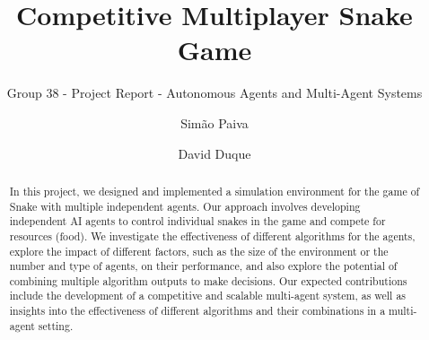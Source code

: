 \documentclass[sigconf]{aamas}  %
\begin{document}
\title{Competitive Multiplayer Snake Game}  %


\subtitle{Group 38 - Project Report - Autonomous Agents and Multi-Agent Systems}

%
\author{Simão Paiva}

\author{David Duque}
%
%
%
%
%
%


\begin{abstract}  %
In this project, we designed and implemented a simulation environment for the game of Snake with multiple independent agents.
Our approach involves developing independent AI agents to control individual snakes in the game and compete for resources (food).
We investigate the effectiveness of different algorithms for the agents, explore the impact of different factors,
such as the size of the environment or the number and type of agents, on their performance, and also explore the potential of
combining multiple algorithm outputs to make decisions.
Our expected contributions include the development of a competitive and scalable multi-agent system, as well as insights
into the effectiveness of different algorithms and their combinations in a multi-agent setting.
\end{abstract}
\end{document}
